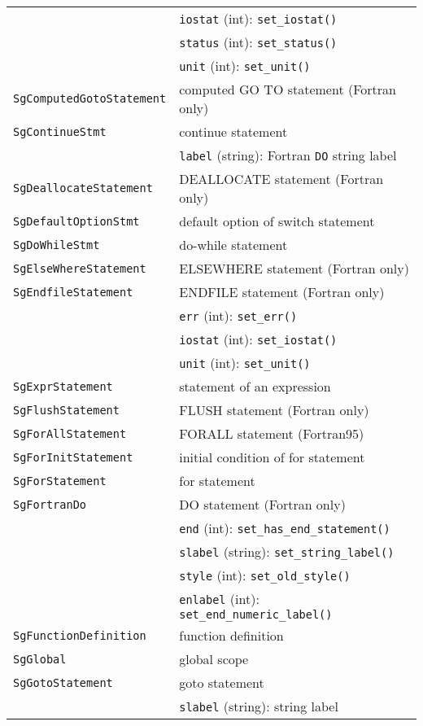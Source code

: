 \begin{longtable}[l]{l|p{10cm}}
 & \texttt{iostat} (int): \texttt{set\_iostat()}\\
 & \texttt{status} (int): \texttt{set\_status()}\\
 & \texttt{unit} (int): \texttt{set\_unit()}\\
 \texttt{SgComputedGotoStatement}& computed GO TO statement (Fortran only)\\
 \texttt{SgContinueStmt}& continue statement\\
 & \texttt{label} (string): Fortran \texttt{DO} string label\\
 \texttt{SgDeallocateStatement}& DEALLOCATE statement (Fortran only)\\
 \texttt{SgDefaultOptionStmt}& default option of switch statement\\
 \texttt{SgDoWhileStmt}& do-while statement\\
 \texttt{SgElseWhereStatement}& ELSEWHERE statement (Fortran only)\\
 \texttt{SgEndfileStatement}& ENDFILE statement (Fortran only)\\
 & \texttt{err} (int): \texttt{set\_err()}\\
 & \texttt{iostat} (int): \texttt{set\_iostat()}\\
 & \texttt{unit} (int): \texttt{set\_unit()}\\
 \texttt{SgExprStatement}& statement of an expression\\
 \texttt{SgFlushStatement}& FLUSH statement (Fortran only)\\
 \texttt{SgForAllStatement}& FORALL statement (Fortran95)\\
 \texttt{SgForInitStatement}& initial condition of for statement\\
 \texttt{SgForStatement}& for statement\\
 \texttt{SgFortranDo}& DO statement (Fortran only)\\
 & \texttt{end} (int): \texttt{set\_has\_end\_statement()}\\
 & \texttt{slabel} (string): \texttt{set\_string\_label()}\\
 & \texttt{style} (int): \texttt{set\_old\_style()}\\
 & \texttt{enlabel} (int): \texttt{set\_end\_numeric\_label()}\\
 \texttt{SgFunctionDefinition}& function definition\\
 \texttt{SgGlobal}& global scope\\
 \texttt{SgGotoStatement}& goto statement\\
 & \texttt{slabel} (string): string label\\

\end{longtable}
